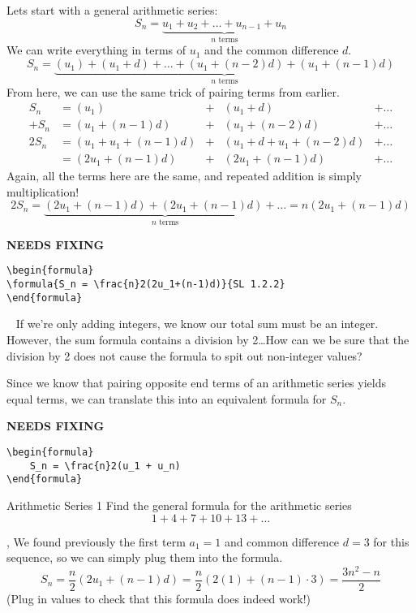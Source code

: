 \documentclass[../../main.tex]{subfiles}
\begin{document}
Lets start with a general arithmetic series:
\[
    S_n = \underbrace{u_1 + u_2 + \ldots + u_{n-1} + u_n}_{n\text{ terms}}
\]
We can write everything in terms of \(u_1\) and the common difference \(d\).
\[
    S_n = \underbrace{(u_1) + (u_1 + d) + \ldots + (u_1 + (n-2)d) + (u_1 + (n-1)d)}_{n\text{ terms}}
\]
From here, we can use the same trick of pairing terms from earlier.
\begin{align}
    S_n &= (u_1) &+& (u_1 + d) &+ \ldots\\
    +S_n &= (u_1 + (n-1)d) &+& (u_1 + (n-2)d) &+ \ldots\\
    2S_n &= (u_1 + u_1 + (n-1)d) &+& (u_1 + d + u_1 + (n-2)d) &+ \ldots\\
    &= (2u_1 + (n-1)d) &+& (2u_1 + (n-1)d) &+ \ldots
\end{align}
Again, all the terms here are the same, and repeated addition is simply multiplication!
\[
    2S_n = \underbrace{(2u_1 + (n-1)d) + (2u_1 + (n-1)d) + \ldots}_{n\text{ terms}} = n(2u_1 + (n-1)d)
\]

{\hfill\Large\bfseries NEEDS FIXING\hfill}
\begin{lstlisting}
\begin{formula}
\formula{S_n = \frac{n}2(2u_1+(n-1)d)}{SL 1.2.2}
\end{formula}
 \end{lstlisting}

\begin{thinking}{~}
    If we're only adding integers, we know our total sum must be an integer. However, the sum formula contains a division by 2\ldots How can we be sure that the division by 2 does not cause the formula to spit out non-integer values?
\end{thinking}

Since we know that pairing opposite end terms of an arithmetic series yields equal terms, we can translate this into an equivalent formula for \(S_n\).

{\hfill\Large\bfseries NEEDS FIXING\hfill}
\begin{lstlisting}
\begin{formula}
    S_n = \frac{n}2(u_1 + u_n)
\end{formula}
 \end{lstlisting}

\begin{example}{Arithmetic Series 1}
Find the general formula for the arithmetic series
\[
    1 + 4 + 7 + 10 + 13 + \ldots
\]

\sep
We found previously the first term \(a_1 = 1\) and common difference \(d = 3\) for this sequence, so we can simply plug them into the formula.
\[
    S_n = \frac{n}2(2u_1+(n-1)d) = \frac{n}2(2(1)+(n-1)\cdot3) = \frac{3n^2-n}2
\]
(Plug in values to check that this formula does indeed work!)
\end{example}
\end{document}
